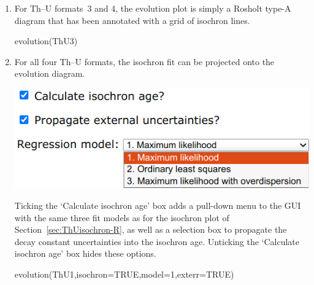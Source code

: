 \begin{refsection}
\begin{enumerate}
\begin{enumerate}
\end{enumerate}

\item For Th--U formats~3 and 4, the evolution plot is simply a
  Rosholt type-A diagram that has been annotated with a grid of
  isochron lines.

\begin{console}
evolution(ThU3)
\end{console}

\item For all four Th--U formats, the isochron fit can be projected
  onto the evolution diagram.\\

  \begin{minipage}[t]{.55\linewidth}
    \strut\vspace*{-\baselineskip}\newline
    \includegraphics[width=\linewidth]{../figures/ThUevolutionIsochron.png}
  \end{minipage}
  \begin{minipage}[t]{.45\linewidth}
    Ticking the `Calculate isochron age' box adds a pull-down menu
    to the GUI with the same three fit models as for the isochron
    plot of Section~\ref{sec:ThUisochron-R}, as well as a selection
    box to propagate the decay constant uncertainties into the
    isochron age. Unticking the `Calculate isochron age' box hides
    these options.
  \end{minipage}

\begin{console}
evolution(ThU1,isochron=TRUE,model=1,exterr=TRUE)
\end{console}


\end{enumerate}
\end{refsection}
